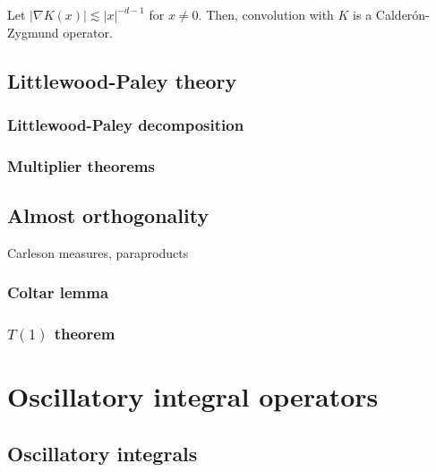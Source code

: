 \documentclass{../../large}
\begin{document}
\begin{prb}
Let $|\nabla K(x)|\lesssim|x|^{-d-1}$ for $x\ne0$.
Then, convolution with $K$ is a Calder\'on-Zygmund operator.
\end{prb}

\begin{prb}
\end{prb}



\chapter{Littlewood-Paley theory}
\section{Littlewood-Paley decomposition}
\section{Multiplier theorems}



\chapter{Almost orthogonality}
Carleson measures, paraproducts
\section{Coltar lemma}
\section{$T(1)$ theorem}




\part{Oscillatory integral operators}


\chapter{Oscillatory integrals}
\end{document}
